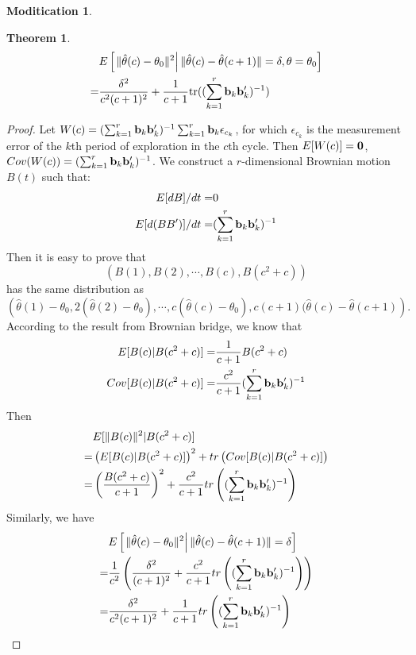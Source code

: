 \documentclass{article}
\newtheorem{theorem}{Theorem}
\theoremstyle{plain}
\theoremstyle{definition}
\newtheorem{modification}{Moditication}
\begin{document}
\begin{modification}
\begin{theorem}
\begin{align*}
&E\left[\left.\|\hat{\theta}(c)-\theta_0\|^2 \right | \|\hat{\theta}(c)-\hat{\theta}(c+1)\|=\bold{\delta}, \theta = \theta_0\right]\\
= & \frac{\delta^2}{c^2(c+1)^2} + \frac{1}{c+1}\text{tr}((\sum_{k=1}^{r}\bold{b}_k\bold{b}_k')^{-1})
\end{align*}
\end{theorem}
\begin{proof}
Let $W(c)=(\sum_{k=1}^{r}\bold{b}_k\bold{b}_k')^{-1}\sum_{k=1}^{r}\bold{b}_k \epsilon_{c_k}$, for which $\epsilon_{c_k}$ is the measurement error of the $k$th period of exploration in the $c$th cycle. Then $E[W(c)]=\bold{0}$, $Cov(W(c))=(\sum_{k=1}^{r}\bold{b}_k\bold{b}_k')^{-1}$.
We construct a $r$-dimensional Brownian motion $B(t)$ such that:
\begin{align*}
E[dB]/dt = &0\\
E[d(BB')]/dt = &(\sum_{k=1}^{r}\bold{b}_k\bold{b}_k')^{-1}
\end{align*}
Then it is easy to prove that \[\left(B(1), B(2), \cdots, B(c), B(c^2+c)\right)\] has the same distribution as \[\left(\hat{\theta}(1)-\theta_0, 2(\hat{\theta}(2)-\theta_0), \cdots, c(\hat{\theta}(c)-\theta_0), c(c+1)(\hat{\theta}(c)-\hat{\theta}(c+1)\right).\]
According to the result from Brownian bridge, we know that
\begin{align*}
E[B(c)|B(c^2+c)] = & \frac{1}{c+1}B(c^2+c)\\
Cov[B(c)|B(c^2+c)] = & \frac{c^2}{c+1}(\sum_{k=1}^{r}\bold{b}_k\bold{b}_k')^{-1}
\end{align*}
Then
\begin{align*}
& E[\|B(c)\|^2|B(c^2+c)] \\
=& \left(E[B(c)|B(c^2+c)]\right)^2 + tr\left(Cov[B(c)|B(c^2+c)] \right)\\
=&\left(\frac{B(c^2+c)}{c+1}\right)^2+\frac{c^2}{c+1}tr\left((\sum_{k=1}^{r}\bold{b}_k\bold{b}_k')^{-1}\right)
\end{align*}
Similarly, we have
\begin{align*}
& E\left[\left.\|\hat{\theta}(c)-\theta_0\|^2\right|\|\hat{\theta}(c)-\hat{\theta}(c+1)\|={\delta}\right] \\
=& \frac{1}{c^2}\left(\frac{\delta^2}{(c+1)^2} + \frac{c^2}{c+1}tr\left((\sum_{k=1}^{r}\bold{b}_k\bold{b}_k')^{-1}\right)\right)\\
=& \frac{\delta^2}{c^2(c+1)^2}+ \frac{1}{c+1}tr\left((\sum_{k=1}^{r}\bold{b}_k\bold{b}_k')^{-1}\right)
\end{align*}
\end{proof}
\end{modification}
\end{document}
